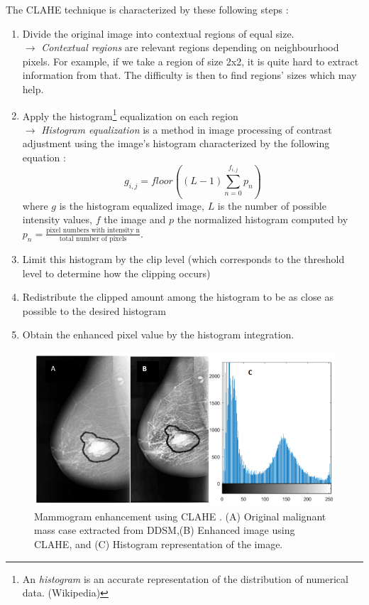 \documentclass[11pt, openany]{report}
\theoremstyle{plain}
\theoremstyle{definition}
\theoremstyle{remark}
\begin{document}
The CLAHE technique is characterized by these following steps \cite{breast-cancer}: 
\begin{enumerate}
\item Divide the original image into contextual regions of equal size. \\
	  $\rightarrow$ \textit{Contextual regions} are relevant regions depending on neighbourhood pixels. For example, if we take a region of size 2x2, it is quite hard to extract information from that. The difficulty is then to find regions' sizes which may help.   

\newpage	  
\item Apply the histogram\footnote{An \textit{histogram} is an accurate representation of the distribution of numerical data. (Wikipedia)} equalization on each region \\ 
	  $\rightarrow$ \textit{Histogram equalization} is a method in image processing of contrast adjustment using the image's histogram characterized by the following equation \cite{book-digital-processing}: 
	  $$ g_{i,j} = floor((L-1) \sum_{n=0}^{f_{i,j}} p_{n}) $$ where $g$ is the histogram equalized image, $L$ is the number of possible intensity values, $f$ the image and $p$ the normalized histogram computed by $p_{n} = \frac{\text{pixel numbers with intensity n}}{\text{total number of pixels}}$. 
	  
\item Limit this histogram by the clip level (which corresponds to the threshold level to determine how the clipping occurs) 

\item Redistribute the clipped amount among the histogram to be as close as possible to the desired histogram

\item Obtain the enhanced pixel value by the histogram integration. 
\end{enumerate}

\begin{figure}[h]
  \centering
  \includegraphics[scale=0.55]{figures/CLAHE.png}
  \caption{Mammogram enhancement using CLAHE \cite{breast-cancer}. (A) Original malignant mass case extracted from DDSM,(B) Enhanced image using CLAHE, and (C) Histogram representation of the image.}
  \label{fig:CLAHE}
\end{figure}
\end{document}
